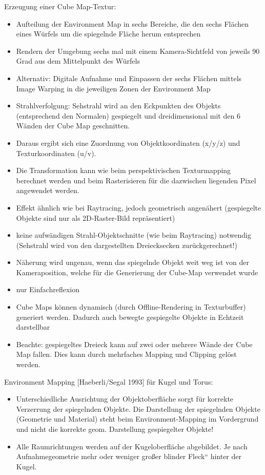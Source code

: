 \documentclass[10pt,landscape]{article}
\begin{document}
\begin{multicols}{3}
Erzeugung einer Cube Map-Textur:
\begin{itemize}
  \item Aufteilung der Environment Map in sechs Bereiche, die den sechs Flächen eines Würfels um die spiegelnde Fläche herum entsprechen
  \item Rendern der Umgebung sechs mal mit einem Kamera-Sichtfeld von jeweils 90 Grad aus dem Mittelpunkt des Würfels
  \item Alternativ: Digitale Aufnahme und Einpassen der sechs Flächen mittels Image Warping in die jeweiligen Zonen der Environment Map
  \item Strahlverfolgung: Sehstrahl wird an den Eckpunkten des Objekts (entsprechend den Normalen) gespiegelt und dreidimensional mit den 6 Wänden der Cube Map geschnitten.
  \item Daraus ergibt sich eine Zuordnung von Objektkoordinaten (x/y/z) und Texturkoordinaten (u/v).
  \item Die Transformation kann wie beim perspektivischen Texturmapping berechnet werden und beim Rasterisieren für die dazwischen liegenden Pixel angewendet werden.
  \item Effekt ähnlich wie bei Raytracing, jedoch geometrisch angenähert (gespiegelte Objekte sind nur als 2D-Raster-Bild repräsentiert)
  \item keine aufwändigen Strahl-Objektschnitte (wie beim Raytracing) notwendig (Sehstrahl wird von den dargestellten Dreiecksecken zurückgerechnet!)
  \item Näherung wird ungenau, wenn das spiegelnde Objekt weit weg ist von der Kameraposition, welche für die Generierung der Cube-Map verwendet wurde
  \item nur Einfachreflexion
  \item Cube Maps können dynamisch (durch Offline-Rendering in Texturbuffer) generiert werden. Dadurch auch bewegte gespiegelte Objekte in Echtzeit darstellbar
  \item Beachte: gespiegeltes Dreieck kann auf zwei oder mehrere Wände der Cube Map fallen. Dies kann durch mehrfaches Mapping und Clipping gelöst werden.
\end{itemize}

Environment Mapping [Haeberli/Segal 1993] für Kugel und Torus: 
\begin{itemize}
  \item Unterschiedliche Ausrichtung der Objektoberfläche sorgt für korrekte Verzerrung der spiegelnden Objekte. Die Darstellung der spiegelnden Objekte (Geometrie und Material) steht beim Environment-Mapping im Vordergrund und nicht die korrekte geom. Darstellung gespiegelter Objekte!
  \item Alle Raumrichtungen werden auf der Kugeloberfläche abgebildet. Je nach Aufnahmegeometrie mehr oder weniger großer blinder Fleck“ hinter der Kugel.
\end{itemize}


\end{multicols}
\end{document}
